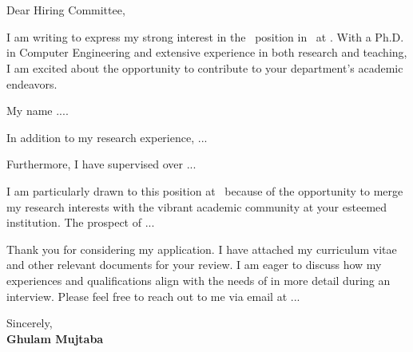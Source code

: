 \vspace*{15pt}


{\large
\begin{flushleft}
\university                      \\
\textbf{\department}        \\
\end{flushleft}

\vspace*{8pt}


\begin{flushleft}
Dear Hiring Committee,
\end{flushleft}

\vspace*{10pt}



\vspace*{7pt}

\justifying

I am writing to express my strong interest in the \jobtitle \ position in \department \ at \university. With a Ph.D. in Computer Engineering and extensive experience in both research and teaching, I am excited about the opportunity to contribute to your department's academic endeavors.


\vspace*{7pt}

My name ....

\vspace*{7pt}

In addition to my research experience, ...




\vspace*{7pt}

Furthermore, I have supervised over ...


\vspace*{7pt}

I am particularly drawn to this position at \university \ because of the opportunity to merge my research interests with the vibrant academic community at your esteemed institution. The prospect of ...


\vspace*{7pt}

Thank you for considering my application. I have attached my curriculum vitae and other relevant documents for your review. I am eager to discuss how my experiences and qualifications align with the needs of \department in more detail during an interview. Please feel free to reach out to me via email at ...


\vspace{1em}

\begin{flushleft}
Sincerely, \\
\textbf{Ghulam Mujtaba} \\

\end{flushleft}
}


\vspace{0.5cm}

